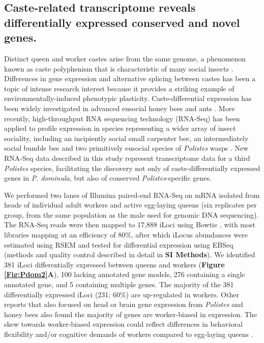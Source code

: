 \subsection{Caste-related transcriptome reveals differentially expressed
conserved and novel genes.} Distinct queen and worker castes arise from
the same genome, a phenomenon known as caste polyphenism that is
characteristic of many social insects \cite{Smith2008}.
Differences in gene expression and alternative splicing between castes
has been a topic of intense research interest because it provides a
striking example of environmentally-induced phenotypic plasticity.
Caste-differential expression has been widely investigated in advanced
eusocial honey bees \cite{ChenDiffExp,GrozingerDiffExp,WhitfieldDiffExp} and ants
\cite{OmettoDiffExp,SimolaDiffExp}. More recently, high-throughput RNA sequencing technology
(RNA-Seq) has been applied to profile expression in species representing
a wider array of insect sociality, including an incipiently social small
carpenter bee, an intermediately social bumble bee
\cite{HarrisonDiffExp} and
two primitively eusocial species of \textit{Polistes} wasps \cite{Berens2015,PcanTrans}. New
RNA-Seq data described in this study represent transcriptome data for a
third \textit{Polistes} species, facilitating the discovery not only of
caste-differentially expressed genes in \textit{P. dominula}, but also of
conserved \textit{Polistes}-specific genes.

We performed two lanes of Illumina paired-end RNA-Seq on mRNA isolated
from heads of individual adult workers and active egg-laying queens (six
replicates per group, from the same population as the male used for
genomic DNA sequencing). The RNA-Seq reads were then mapped to 17,888
iLoci using Bowtie \cite{Bowtie}, with most libraries mapping at an efficiency of
80\%, after which iLocus abundances were estimated using RSEM \cite{RSEM} and tested for
differential expression using EBSeq \cite{EBSeq} \cite{EBSeq} (methods
and quality control described in detail in \textbf{SI Methods}). We
identified 381 iLoci differentially expressed between queens and workers
(\textbf{Figure \ref{Fig:Pdom2}A}), 100 lacking annotated gene models, 276 containing
a single annotated gene, and 5 containing multiple genes. The majority
of the 381 differentially expressed iLoci (231; 60\%) are up-regulated
in workers. Other reports that also focused on head or brain gene
expression from \textit{Polistes} \cite{Berens2015,PcanTrans} and
honey bees \cite{GrozingerDiffExp} also found the majority of genes are worker-biased in expression.
The skew towards worker-biased expression could reflect differences in
behavioral flexibility and/or cognitive demands of workers compared to
egg-laying queens \cite{ODonnell2011}.

